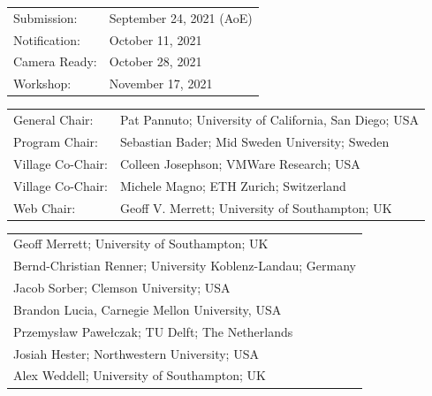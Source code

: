 \documentclass[a4paper,10pt]{scrartcl}
\begin{document}
\vskip4mm
\begin{minipage}{.49\textwidth}
\begin{tcolorbox}[boxsep=0pt, top=2mm, left=2mm, right=2mm, bottom=0mm, arc=5pt, auto outer arc, colback=cfp_lightcolor, colframe=white]
  \renewcommand{\baselinestretch}{0.95} 
  \footnotesize
  \setlength\tabcolsep{0pt}
  \begin{tabular}{p{2.0cm}l}
    Submission:   &  September 24, 2021 (AoE) \\
    Notification: &  October 11, 2021 \\
    Camera Ready: &  October 28, 2021 \\
    Workshop:     &  November 17, 2021\\
  \end{tabular}
  
  \vskip1mm
  \begin{tabular}{p{2.0cm}l}
  General Chair:       & Pat Pannuto; University of California, San Diego; USA \\     %
  Program Chair:       & Sebastian Bader; Mid Sweden University; Sweden \\     %
  Village Co-Chair:    & Colleen Josephson; VMWare Research; USA \\
  Village Co-Chair:    & Michele Magno; ETH Zurich; Switzerland \\
  Web Chair:           & Geoff V. Merrett; University of Southampton; UK
  \end{tabular}

  \vskip1mm
  \begin{tabular}{l}
  Geoff Merrett; University of Southampton; UK \\
  Bernd-Christian Renner; University Koblenz-Landau; Germany \\
  Jacob Sorber; Clemson University; USA \\
  Brandon Lucia, Carnegie Mellon University, USA \\
  Przemys\textsf{\l{}}aw Pawe\textsf{\l{}}czak; TU Delft; The Netherlands \\
  Josiah Hester; Northwestern University; USA \\
  Alex Weddell; University of Southampton; UK \\
  \end{tabular}


\end{tcolorbox}
\end{minipage}
\end{document}

